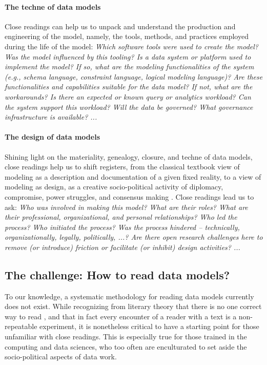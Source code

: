 \paragraph{The techne of data models} Close readings can help us to unpack and understand the production and engineering of the model, namely, the tools, methods, and practices employed during the life of the model:  
{\em Which software tools were used to create the model?  Was the model influenced by this tooling?  Is a data system or platform used to implement the model?  If so, what are the modeling functionalities of the system (e.g., schema language, constraint language, logical modeling language)?  Are these functionalities and capabilities suitable for the data model?  If not, what are the workarounds?  Is there an expected or known query or analytics workload?  Can the system support this workload? Will the data be governed?  What governance infrastructure is available? ...}

\paragraph{The design of data models} Shining light on the materiality, genealogy, closure, and techne of data models, close readings help us to shift registers, from the classical textbook view of modeling as a description and documentation of a given fixed reality, to a view of modeling as design, as a creative socio-political activity of diplomacy, compromise, power struggles, and consensus making \cite{Feinberg17,shaw,simsion}.  Close readings lead us to ask: {\em Who was involved in making this model?  What are their roles?  What are their professional, organizational, and personal relationships?  Who led the process?  Who initiated the process?  Was the process hindered -- technically, organizationally, legally, politically, ...? Are there open research challenges here to remove (or introduce) friction or facilitate (or inhibit) design activities? ...}

\subsection{The challenge: How to read data models?}
To our knowledge, a systematic methodology for reading data models currently does not exist.  While recognizing from literary theory that there is no one correct way to read \cite{frank}, and that in fact every encounter of a reader with a text is a non-repeatable experiment, it is nonetheless critical to have a starting point for those unfamiliar with close readings.  This is especially true for those trained in the computing and data sciences, who too often are enculturated to set aside the socio-political aspects of data work.

